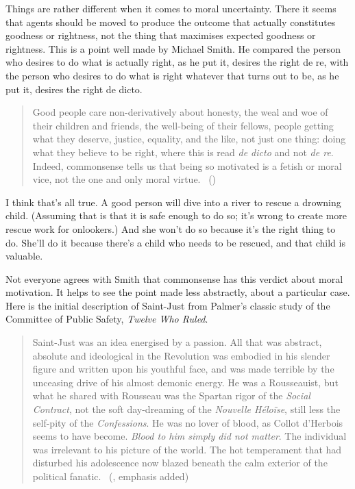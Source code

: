 \documentclass[
  10pt,
  letterpaper,
  twoside]{scrbook}
\begin{document}
Things are rather different when it comes to moral uncertainty. There it
seems that agents should be moved to produce the outcome that actually
constitutes goodness or rightness, not the thing that maximises expected
goodness or rightness. This is a point well made by Michael Smith. He
compared the person who desires to do what is actually right, as he put
it, desires the right de re, with the person who desires to do what is
right whatever that turns out to be, as he put it, desires the right de
dicto.

\begin{quote}
Good people care non-derivatively about honesty, the weal and woe of
their children and friends, the well-being of their fellows, people
getting what they deserve, justice, equality, and the like, not just one
thing: doing what they believe to be right, where this is read \emph{de
dicto} and not \emph{de re}. Indeed, commonsense tells us that being so
motivated is a fetish or moral vice, not the one and only moral virtue.
~()
\end{quote}

I think that's all true. A good person will dive into a river to rescue
a drowning child. (Assuming that is that it is safe enough to do so;
it's wrong to create more rescue work for onlookers.) And she won't do
so because it's the right thing to do. She'll do it because there's a
child who needs to be rescued, and that child is valuable.

Not everyone agrees with Smith that commonsense has this verdict about
moral motivation. It helps to see the point made less abstractly, about
a particular case. Here is the initial description of {Saint-Just} from
Palmer's classic study of the Committee of Public Safety, \emph{Twelve
Who Ruled}.

\begin{quote}
Saint-Just was an idea energised by a passion. All that was abstract,
absolute and ideological in the Revolution was embodied in his slender
figure and written upon his youthful face, and was made terrible by the
unceasing drive of his almost demonic energy. He was a Rousseauist, but
what he shared with Rousseau was the Spartan rigor of the \emph{Social
Contract}, not the soft day-dreaming of the \emph{Nouvelle Héloïse},
still less the self-pity of the \emph{Confessions}. He was no lover of
blood, as Collot d'Herbois seems to have become. \emph{Blood to him
simply did not matter}. The individual was irrelevant to his picture of
the world. The hot temperament that had disturbed his adolescence now
blazed beneath the calm exterior of the political fanatic.
~(, emphasis added)
\end{quote}
\end{document}
